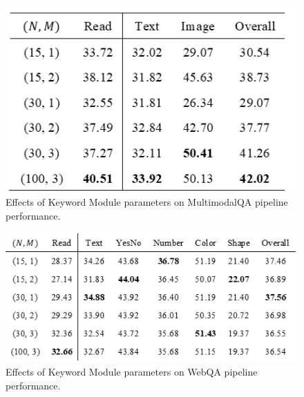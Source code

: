 \documentclass[twocolumn]{article}
\begin{document}
\begin{figure}
    \centering
    \includegraphics[width=1\linewidth]{image4.png}
    \caption{Effects of Keyword Module parameters on MultimodalQA pipeline performance.}
    \label{fig:enter-label}
\end{figure}

\begin{figure}
    \centering
    \includegraphics[width=1\linewidth]{image5.png}
    \caption{Effects of Keyword Module parameters on WebQA pipeline performance.}
    \label{fig:enter-label}
\end{figure}
\end{document}
